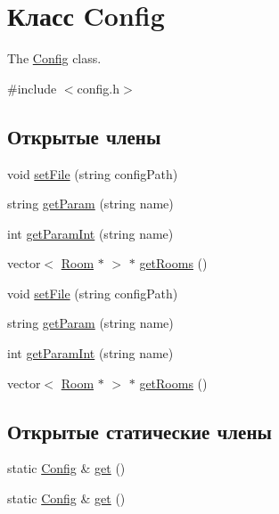 \hypertarget{class_config}{}\section{Класс Config}
\label{class_config}


The \hyperlink{class_config}{Config} class.  




{\ttfamily \#include $<$config.\+h$>$}

\subsection*{Открытые члены}
\begin{DoxyCompactItemize}
\item 
void \hyperlink{class_config_a06542bc14d3414c075a9cbb04f1e9a37}{set\+File} (string config\+Path)
\item 
string \hyperlink{class_config_ae20fcfa28d82f1d2d1a4387a00a9f8b2}{get\+Param} (string name)
\item 
int \hyperlink{class_config_a37b55073aa9e1a0e5a06323df5686c13}{get\+Param\+Int} (string name)
\item 
vector$<$ \hyperlink{class_room}{Room} $\ast$ $>$ $\ast$ \hyperlink{class_config_a644ff01239e20fabb038a2b2eddf1a26}{get\+Rooms} ()
\item 
void \hyperlink{class_config_a06542bc14d3414c075a9cbb04f1e9a37}{set\+File} (string config\+Path)
\item 
string \hyperlink{class_config_ae20fcfa28d82f1d2d1a4387a00a9f8b2}{get\+Param} (string name)
\item 
int \hyperlink{class_config_a37b55073aa9e1a0e5a06323df5686c13}{get\+Param\+Int} (string name)
\item 
vector$<$ \hyperlink{class_room}{Room} $\ast$ $>$ $\ast$ \hyperlink{class_config_ab10c3b7d3a76fcfa411ecba1dddc9716}{get\+Rooms} ()
\end{DoxyCompactItemize}
\subsection*{Открытые статические члены}
\begin{DoxyCompactItemize}
\item 
static \hyperlink{class_config}{Config} \& \hyperlink{class_config_a5154d96acc76c1fae8c564f3705fe197}{get} ()
\item 
static \hyperlink{class_config}{Config} \& \hyperlink{class_config_a5154d96acc76c1fae8c564f3705fe197}{get} ()
\end{DoxyCompactItemize}
